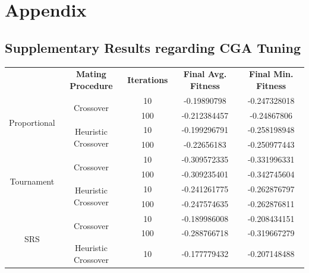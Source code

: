 \documentclass[10pt]{article}
\begin{document}
\section{Appendix}
\subsection{Supplementary Results regarding CGA Tuning}
\label{sec:CGA_tuning_results}
\begin{table}[H]
    \centering
    \begin{tabular}{|*{5}{c|}}
        \hline
        \renewcommand{\arraystretch}{1.5}
        \multirow{2}{*}{\textbf{Selection Method}} & \multirow{2}{*}{\textbf{Mating Procedure}} & \multirow{2}{*}{\textbf{Iterations}} & \multirow{2}{*}{\textbf{Final Avg. Fitness}} & \multirow{2}{*}{\textbf{Final Min. Fitness}} \\
        & & & & \\
        \hline
        \multirow{4}{*}{Proportional} & \multirow{2}{*}{Crossover} & 10 & -0.19890798 & -0.247328018 \\
        & &\cellcolor{lightgray} 100 &\cellcolor{lightgray} -0.212384457 &\cellcolor{lightgray} -0.24867806 \\
        \cline{2-5}
        & \multirow{2}{*}{Heuristic Crossover} & 10 & -0.199296791 & -0.258198948 \\
        & &\cellcolor{lightgray} 100 &\cellcolor{lightgray} -0.22656183 & \cellcolor{lightgray} -0.250977443 \\
        \hline
        \multirow{4}{*}{Tournament} & \multirow{2}{*}{Crossover} & 10 & -0.309572335 & -0.331996331 \\
        & &\cellcolor{lightgray} 100 &\cellcolor{lightgray} -0.309235401 &\cellcolor{lightgray} -0.342745604 \\
        \cline{2-5}
        & \multirow{2}{*}{Heuristic Crossover} & 10 & -0.241261775 & -0.262876797 \\
        & &\cellcolor{lightgray} 100 &\cellcolor{lightgray} -0.247574635 &\cellcolor{lightgray} -0.262876811 \\
        \hline
        \multirow{4}{*}{SRS} & \multirow{2}{*}{Crossover} & 10 & -0.189986008 & -0.208434151 \\
        & &\cellcolor{lightgray} 100 &\cellcolor{lightgray} -0.288766718 &\cellcolor{lightgray} -0.319667279 \\
        \cline{2-5}
        & \multirow{2}{*}{Heuristic Crossover} & 10 & -0.177779432 & -0.207148488 \\

\end{tabular}
\end{table}
\end{document}
